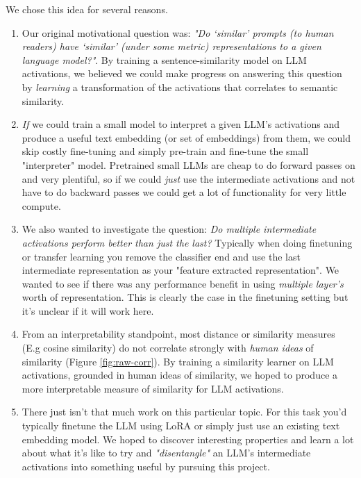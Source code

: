 \documentclass{article}
\begin{document}
We chose this idea for several reasons.
\begin{enumerate}
    \item Our original motivational question was: \textit{"Do ‘similar’ prompts (to human readers) have ‘similar’ (under some metric) representations to a given language model?"}. By training a sentence-similarity model on LLM activations, we believed we could make progress on answering this question by \textit{learning} a transformation of the activations that correlates to semantic similarity.

    \item \textit{If} we could train a small model to interpret a given LLM's activations and produce a useful text embedding (or set of embeddings) from them, we could skip costly fine-tuning and simply pre-train and fine-tune the small "interpreter" model. Pretrained small LLMs are cheap to do forward passes on and very plentiful, so if we could \textit{just} use the intermediate activations and not have to do backward passes we could get a lot of functionality for very little compute.
    
    \item We also wanted to investigate the question: \textit{Do multiple intermediate activations perform better than just the last?} Typically when doing finetuning or transfer learning you remove the classifier end and use the last intermediate representation as your "feature extracted representation". We wanted to see if there was any performance benefit in using \textit{multiple layer's} worth of representation. This is clearly the case in the finetuning setting \cite{tang2024poolingattentioneffectivedesigns} but it's unclear if it will work here.
    
    \item From an interpretability standpoint, most distance or similarity measures (E.g cosine similarity) do not correlate strongly with \textit{human ideas} of similarity (Figure \ref{fig:raw-corr}). By training a similarity learner on LLM activations, grounded in human ideas of similarity, we hoped to produce a more interpretable measure of similarity for LLM activations.
    
    \item There just isn't that much work on this particular topic. For this task you'd typically finetune the LLM using LoRA \cite{hu2021loralowrankadaptationlarge} or simply just use an existing text embedding model. We hoped to discover interesting properties and learn a lot about what it's like to try and \textit{"disentangle"} an LLM's intermediate activations into something useful by pursuing this project. %
    

\end{enumerate}
\end{document}
